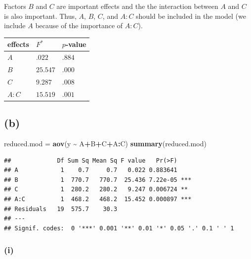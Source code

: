 \documentclass[
  11pt,
]{article}
\newenvironment{Shaded}{\begin{snugshade}}{\end{snugshade}}
\newcommand{\FunctionTok}[1]{\textcolor[rgb]{0.13,0.29,0.53}{\textbf{#1}}}
\newcommand{\NormalTok}[1]{#1}
\newcommand{\OtherTok}[1]{\textcolor[rgb]{0.56,0.35,0.01}{#1}}
\newcommand{\SpecialCharTok}[1]{\textcolor[rgb]{0.81,0.36,0.00}{\textbf{#1}}}
\begin{document}
Factors \(B\) and \(C\) are important effects and the the interaction
between \(A\) and \(C\) is also important. Thus, \(A\), \(B\), \(C\),
and \(A:C\) should be included in the model (we include \(A\) because of
the importance of \(A:C\)).

\begin{longtable}[]{@{}lll@{}}
\toprule\noalign{}
effects & \(F^*\) & \(p\)-value \\
\midrule\noalign{}
\endhead
\bottomrule\noalign{}
\endlastfoot
\(A\) & \(.022\) & \(.884\) \\
\(B\) & \(25.547\) & \(.000\) \\
\(C\) & \(9.287\) & \(.008\) \\
\(A:C\) & \(15.519\) & \(.001\) \\
\end{longtable}

\hypertarget{b-1}{%
\subsection{(b)}\label{b-1}}


\begin{Shaded}
\begin{Highlighting}[]
\NormalTok{reduced.mod }\OtherTok{=} \FunctionTok{aov}\NormalTok{(y }\SpecialCharTok{\textasciitilde{}}\NormalTok{ A}\SpecialCharTok{+}\NormalTok{B}\SpecialCharTok{+}\NormalTok{C}\SpecialCharTok{+}\NormalTok{A}\SpecialCharTok{:}\NormalTok{C)}
\FunctionTok{summary}\NormalTok{(reduced.mod)}
\end{Highlighting}
\end{Shaded}

\begin{verbatim}
##             Df Sum Sq Mean Sq F value   Pr(>F)    
## A            1    0.7     0.7   0.022 0.883641    
## B            1  770.7   770.7  25.436 7.22e-05 ***
## C            1  280.2   280.2   9.247 0.006724 ** 
## A:C          1  468.2   468.2  15.452 0.000897 ***
## Residuals   19  575.7    30.3                     
## ---
## Signif. codes:  0 '***' 0.001 '**' 0.01 '*' 0.05 '.' 0.1 ' ' 1
\end{verbatim}

\hypertarget{i}{%
\subsubsection{(i)}\label{i}}
\end{document}
